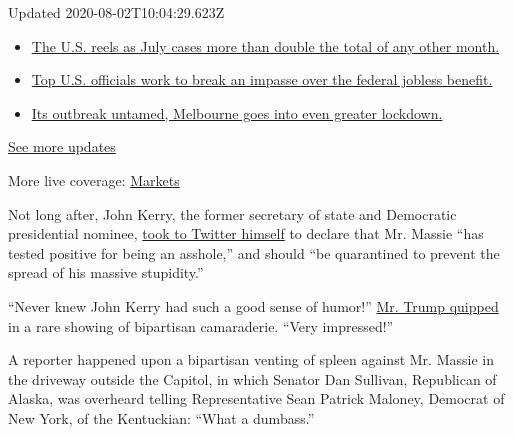 Updated 2020-08-02T10:04:29.623Z

\begin{itemize}
\tightlist
\item
  \href{https://www.nytimes.com/2020/08/01/world/coronavirus-covid-19.html?action=click\&pgtype=Article\&state=default\&region=MAIN_CONTENT_1\&context=storylines_live_updates\#link-34047410}{The
  U.S. reels as July cases more than double the total of any other
  month.}
\item
  \href{https://www.nytimes.com/2020/08/01/world/coronavirus-covid-19.html?action=click\&pgtype=Article\&state=default\&region=MAIN_CONTENT_1\&context=storylines_live_updates\#link-780ec966}{Top
  U.S. officials work to break an impasse over the federal jobless
  benefit.}
\item
  \href{https://www.nytimes.com/2020/08/01/world/coronavirus-covid-19.html?action=click\&pgtype=Article\&state=default\&region=MAIN_CONTENT_1\&context=storylines_live_updates\#link-2bc8948}{Its
  outbreak untamed, Melbourne goes into even greater lockdown.}
\end{itemize}

\href{https://www.nytimes.com/2020/08/01/world/coronavirus-covid-19.html?action=click\&pgtype=Article\&state=default\&region=MAIN_CONTENT_1\&context=storylines_live_updates}{See
more updates}

More live coverage:
\href{https://www.nytimes.com/live/2020/07/31/business/stock-market-today-coronavirus?action=click\&pgtype=Article\&state=default\&region=MAIN_CONTENT_1\&context=storylines_live_updates}{Markets}

Not long after, John Kerry, the former secretary of state and Democratic
presidential nominee,
\href{https://twitter.com/JohnKerry/status/1243552337429438464?s=20}{took
to Twitter himself} to declare that Mr. Massie ``has tested positive for
being an asshole,'' and should ``be quarantined to prevent the spread of
his massive stupidity.''

``Never knew John Kerry had such a good sense of humor!''
\href{https://twitter.com/realDonaldTrump/status/1243572588200280064?s=20}{Mr.
Trump quipped} in a rare showing of bipartisan camaraderie. ``Very
impressed!''

A reporter happened upon a bipartisan venting of spleen against Mr.
Massie in the driveway outside the Capitol, in which Senator Dan
Sullivan, Republican of Alaska, was overheard telling Representative
Sean Patrick Maloney, Democrat of New York, of the Kentuckian: ``What a
dumbass.''


